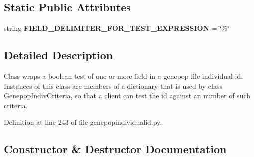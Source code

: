 \subsection*{Static Public Attributes}
\begin{DoxyCompactItemize}
\item 
string {\bfseries F\+I\+E\+L\+D\+\_\+\+D\+E\+L\+I\+M\+I\+T\+E\+R\+\_\+\+F\+O\+R\+\_\+\+T\+E\+S\+T\+\_\+\+E\+X\+P\+R\+E\+S\+S\+I\+ON} = \char`\"{}\%\char`\"{}\hypertarget{classnegui_1_1genepopindividualid_1_1GenepopIndivCriterion_a350c743f531d728cf22f760865c8329d}{}\label{classnegui_1_1genepopindividualid_1_1GenepopIndivCriterion_a350c743f531d728cf22f760865c8329d}

\end{DoxyCompactItemize}


\subsection{Detailed Description}
\begin{DoxyVerb}Class wraps a boolean test of one or more field
in a genepop file individual id.  Instances
of this class are members of a dictionary that
is used by class GenepopIndivCriteria, so that
a client can test the id against an number of
such criteria.
\end{DoxyVerb}
 

Definition at line 243 of file genepopindividualid.\+py.



\subsection{Constructor \& Destructor Documentation}
